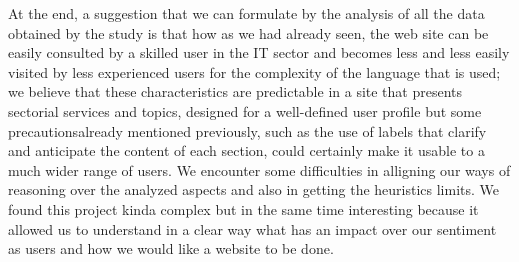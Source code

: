 At the end, a suggestion that we can formulate by the analysis of all the data obtained by the study is that how as we had already seen, the web site can be easily consulted by a skilled user in the IT sector and becomes less and less easily visited by less experienced users for the complexity of the language that is used; we believe that these characteristics are predictable in a site that presents sectorial services and topics, designed for a well-defined user profile but some precautionsalready mentioned previously, such as the use of labels that clarify and anticipate the content of each section, could certainly make it usable to a much wider range of users.
We encounter some difficulties in alligning our ways of reasoning over the analyzed aspects and also in getting the heuristics limits. We found this project kinda complex but in the same time interesting because it allowed us to understand in a clear way what has an impact over our sentiment as users and how we would like a website to be done.
